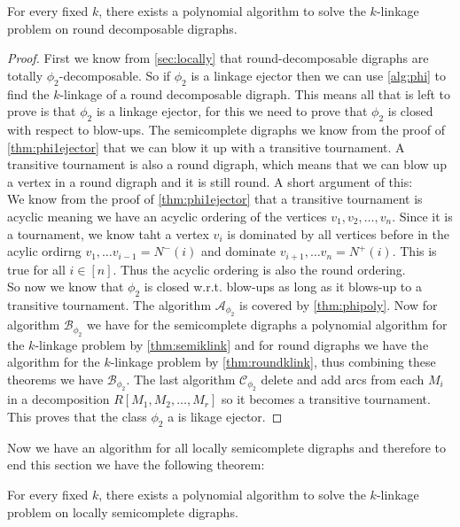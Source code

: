 \begin{thm}
    For every fixed $k$, there exists a polynomial algorithm to solve the $k$-linkage problem on round decomposable digraphs.
\end{thm}
\begin{proof}
    First we know from \autoref{sec:locally} that round-decomposable digraphs are totally $\phi_2$-decomposable. 
    So if $\phi_2$ is a linkage ejector then we can use \autoref{alg:phi} to find the $k$-linkage of a round decomposable digraph. 
    This means all that is left to prove is that $\phi_2$ is a linkage ejector, for this we need to prove that $\phi_2$ is closed with respect to blow-ups.
    The semicomplete digraphs we know from the proof of \autoref{thm:phi1ejector} that we can blow it up with a transitive tournament. 
    A transitive tournament is also a round digraph, which means that we can blow up a vertex in a round digraph and it is still round. A short argument of this:\\
    We know from the proof of \autoref{thm:phi1ejector} that a transitive tournament is acyclic meaning we have an acyclic ordering of the vertices $v_1,v_2,\dots , v_n$. 
    Since it is a tournament, we know taht a vertex $v_i$ is dominated by all vertices before in the acylic ordirng $v_1,\dots v_{i-1}=N^-(i)$ and dominate $v_{i+1},\dots v_n=N^+(i)$. 
    This is true for all $i\in[n]$. 
    Thus the acyclic ordering is also the round ordering.\\
    So now we know that $\phi_2$ is closed w.r.t. blow-ups as long as it blows-up to a transitive tournament. 
    The algorithm $\mathcal{A}_{\phi_2}$ is covered by \autoref{thm:phipoly}.
    Now for algorithm $\mathcal{B}_{\phi_2}$ we have for the semicomplete digraphs a polynomial algorithm for the $k$-linkage problem by \autoref{thm:semiklink} and for round digraphs we have the algorithm for the $k$-linkage problem by \autoref{thm:roundklink}, thus combining these theorems we have $\mathcal{B}_{\phi_2}$. 
    The last algorithm $\mathcal{C}_{\phi_2}$ delete and add arcs from each $M_i$ in a decomposition $R[M_1,M_2,\dots , M_r]$ so it becomes a transitive tournament.  
    This proves that the class $\phi_2$ a is likage ejector.
\end{proof}
Now we have an algorithm for all locally semicomplete digraphs and therefore to end this section we have the following theorem:
\begin{thm}
    For every fixed $k$, there exists a polynomial algorithm to solve the $k$-linkage problem on locally semicomplete digraphs.
\end{thm}
